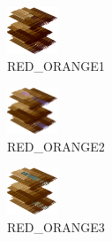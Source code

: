 \hspace{0.1cm}
\begin{minipage}[b]{0.15\linewidth}
\begin{figure}[H]                                                          
  \centering                                                             
  \begin{adjustbox}{width=1.5cm,center}                                   
  \includegraphics[width=1.5cm]{src/colorspace_colourflow/flows/colourflow_33-45.png}%
  \end{adjustbox}                                                        
\caption*{RED\_ORANGE1}                                           
\end{figure}                                                               
\end{minipage}
\hspace{0.1cm}
\begin{minipage}[b]{0.15\linewidth}
\begin{figure}[H]                                                          
  \centering                                                             
  \begin{adjustbox}{width=1.5cm,center}                                   
  \includegraphics[width=1.5cm]{src/colorspace_colourflow/flows/colourflow_34-45.png}%
  \end{adjustbox}                                                        
\caption*{RED\_ORANGE2}                                           
\end{figure}                                                               
\end{minipage}
\hspace{0.1cm}
\begin{minipage}[b]{0.15\linewidth}
\begin{figure}[H]                                                          
  \centering                                                             
  \begin{adjustbox}{width=1.5cm,center}                                   
  \includegraphics[width=1.5cm]{src/colorspace_colourflow/flows/colourflow_35-45.png}%
  \end{adjustbox}                                                        
\caption*{RED\_ORANGE3}                                           
\end{figure}                                                               
\end{minipage}

